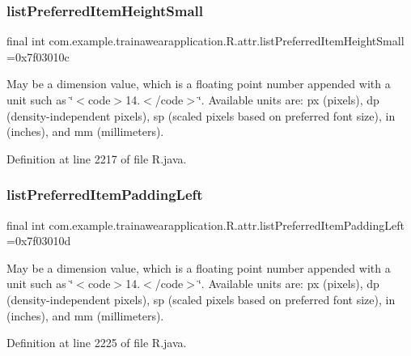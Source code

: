 \subsubsection{\texorpdfstring{listPreferredItemHeightSmall}{listPreferredItemHeightSmall}}
{\footnotesize\ttfamily final int com.\+example.\+trainawearapplication.\+R.\+attr.\+list\+Preferred\+Item\+Height\+Small =0x7f03010c\hspace{0.3cm}{\ttfamily [static]}}

May be a dimension value, which is a floating point number appended with a unit such as \char`\"{}$<$code$>$14.\+5sp$<$/code$>$\char`\"{}. Available units are\+: px (pixels), dp (density-\/independent pixels), sp (scaled pixels based on preferred font size), in (inches), and mm (millimeters). 

Definition at line 2217 of file R.\+java.

\mbox{\label{classcom_1_1example_1_1trainawearapplication_1_1_r_1_1attr_adb22c37aad7960e0fe9b86037f396779}} 
\subsubsection{\texorpdfstring{listPreferredItemPaddingLeft}{listPreferredItemPaddingLeft}}
{\footnotesize\ttfamily final int com.\+example.\+trainawearapplication.\+R.\+attr.\+list\+Preferred\+Item\+Padding\+Left =0x7f03010d\hspace{0.3cm}{\ttfamily [static]}}

May be a dimension value, which is a floating point number appended with a unit such as \char`\"{}$<$code$>$14.\+5sp$<$/code$>$\char`\"{}. Available units are\+: px (pixels), dp (density-\/independent pixels), sp (scaled pixels based on preferred font size), in (inches), and mm (millimeters). 

Definition at line 2225 of file R.\+java.

\mbox{\label{classcom_1_1example_1_1trainawearapplication_1_1_r_1_1attr_a3bfddaccd571f6c1ee19df0ccf47c68b}} 
